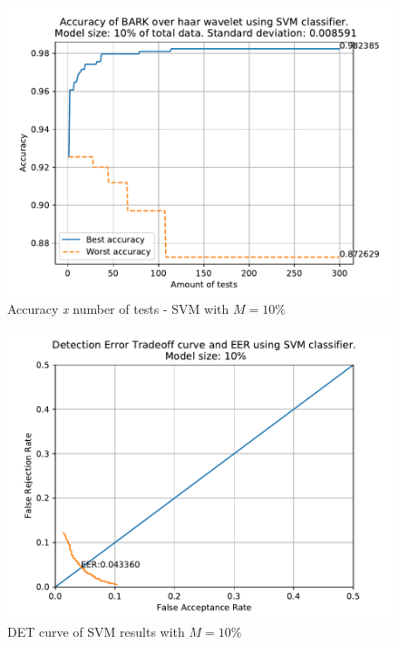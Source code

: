 




	\begin{figure}[H]
		\centering
		\includegraphics[scale=.8]{images/results/confusionMatrices/classifier_SVM_10.pdf}
		\caption{Accuracy \textit{x} number of tests - SVM with $M=10\%$}
		\label{fig:classifiersvm10}
	\end{figure}
	\begin{figure}[H]
		\centering
		\includegraphics[scale=.8]{images/results/det/DET_for_classifier_SVM_10.pdf}
		\caption{DET curve of SVM results with $M=10\%$}
		\label{fig:detsvm10}
	\end{figure}
